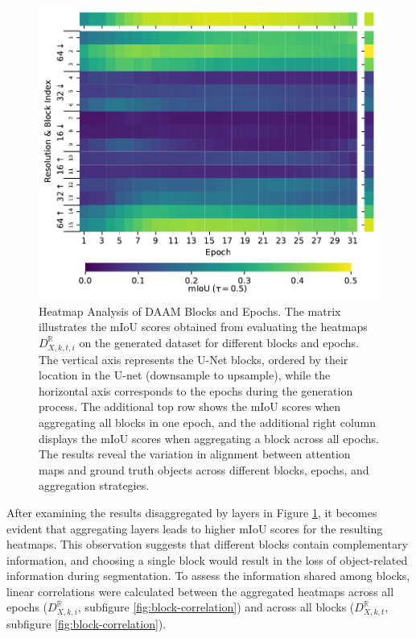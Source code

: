 \begin{figure}
    \centering
    \includegraphics[width=0.8\columnwidth]{img/4-experiments/heatmap_all_05.pdf}
    \caption[Heatmap Analysis of DAAM Blocks and Epochs.]{Heatmap Analysis of DAAM Blocks and Epochs. The matrix illustrates the mIoU scores obtained from evaluating the heatmaps $D_{X,k,t, i}^{\mathbb{R}}$ on the generated dataset for different blocks and epochs. The vertical axis represents the U-Net blocks, ordered by their location in the U-net (downsample to upsample), while the horizontal axis corresponds to the epochs during the generation process. The additional top row shows the mIoU scores when aggregating all blocks in one epoch, and the additional right column displays the mIoU scores when aggregating a block across all epochs. The results reveal the variation in alignment between attention maps and ground truth objects across different blocks, epochs, and aggregation strategies.}
    \label{fig:heatmap-blocks-epochs-all-05}
\end{figure}

After examining the results disaggregated by layers in Figure \ref{fig:heatmap-blocks-epochs-all-05}, it becomes evident that aggregating layers leads to higher mIoU scores for the resulting heatmaps. This observation suggests that different blocks contain complementary information, and choosing a single block would result in the loss of object-related information during segmentation. To assess the information shared among blocks, linear correlations were calculated between the aggregated heatmaps across all epochs ($D_{X,k, i}^{\mathbb{R}}$, subfigure \ref{fig:block-correlation}) and across all blocks ($D_{X,k, t}^{\mathbb{R}}$, subfigure \ref{fig:block-correlation}).

